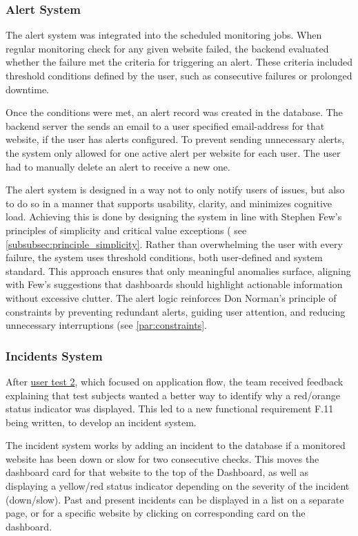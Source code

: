 \subsubsection{Alert System}

The alert system was integrated into the scheduled monitoring jobs. When regular monitoring check for any given website failed, the backend evaluated whether the failure met the criteria for triggering an alert. These criteria included threshold conditions defined by the user, such as consecutive failures or prolonged downtime.

Once the conditions were met, an alert record was created in the database. 
The backend server the  sends an email to a user specified email-address for that website, if the user has alerts configured. To prevent sending unnecessary alerts, the system only allowed for one active alert per website for each user. The user had to manually delete an alert to receive a new one.


The alert system is designed in a way not to only notify users of issues, but also to do so in a manner that supports usability, clarity, and minimizes cognitive load. Achieving this is done by designing the system in line with Stephen Few's principles of simplicity and critical value exceptions ( see \autoref{subsubsec:principle_simplicity}. Rather than overwhelming the user with every failure, the system uses threshold conditions, both user-defined and system standard. This approach ensures that only meaningful anomalies surface, aligning with Few's suggestions that dashboards should highlight actionable information without excessive clutter. The alert logic reinforces Don Norman's principle of constraints by preventing redundant alerts, guiding user attention, and reducing unnecessary interruptions (see \autoref{par:constraints}. 

\subsubsection{Incidents System}
After \hyperref[subsec:user_testing]{user test 2}, which focused on application flow, the team received feedback explaining that test subjects wanted a better way to identify why a red/orange status indicator was displayed. This led to a new functional requirement F.11 being written, to develop an incident system.

The incident system works by adding an incident to the database if a monitored website has been down or slow for two consecutive checks. This moves the dashboard card  for that website to the top of the Dashboard, as well as displaying a yellow/red status indicator depending on the severity of the incident (down/slow). Past and present incidents can be displayed in a list on a separate page, or for a specific website by clicking on corresponding card on the dashboard.

